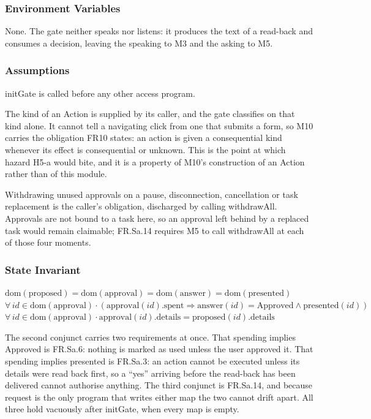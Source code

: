 \documentclass[12pt, titlepage]{article}
\begin{document}
\subsubsection{Environment Variables}

None. The gate neither speaks nor listens: it produces the text of a read-back
and consumes a decision, leaving the speaking to M3 and the asking to M5.

\subsubsection{Assumptions}

initGate is called before any other access program.

\noindent The kind of an Action is supplied by its caller, and the gate
classifies on that kind alone. It cannot tell a navigating click from one that
submits a form, so M10 carries the obligation FR10 states: an action is given a
consequential kind whenever its effect is consequential or unknown. This is the
point at which hazard H5-a would bite, and it is a property of M10's
construction of an Action rather than of this module.

\noindent Withdrawing unused approvals on a pause, disconnection, cancellation
or task replacement is the caller's obligation, discharged by calling
withdrawAll. Approvals are not bound to a task here, so an approval left behind
by a replaced task would remain claimable; FR.Sa.14 requires M5 to call
withdrawAll at each of those four moments.

\subsubsection{State Invariant}

\noindent $\mathrm{dom}(\text{proposed}) = \mathrm{dom}(\text{approval}) =
\mathrm{dom}(\text{answer}) = \mathrm{dom}(\text{presented})$\\
$\forall\, id \in \mathrm{dom}(\text{approval}) \cdot
(\text{approval}(id).\text{spent} \Rightarrow \text{answer}(id) =
\text{Approved} \wedge \text{presented}(id))$\\
$\forall\, id \in \mathrm{dom}(\text{approval}) \cdot
\text{approval}(id).\text{details} = \text{proposed}(id).\text{details}$

\noindent The second conjunct carries two requirements at once. That spending
implies Approved is FR.Sa.6: nothing is marked as used unless the user approved
it. That spending implies presented is FR.Sa.3: an action cannot be executed
unless its details were read back first, so a ``yes'' arriving before the
read-back has been delivered cannot authorise anything. The third conjunct is
FR.Sa.14, and because request is the only program that writes either map the two
cannot drift apart. All three hold vacuously after initGate, when every map is
empty.
\end{document}
